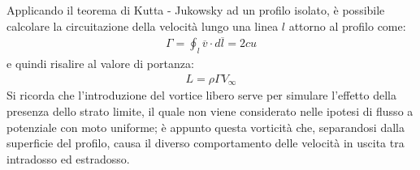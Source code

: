 Applicando il teorema di Kutta - Jukowsky ad un profilo isolato, è possibile calcolare la circuitazione della velocità lungo una linea $l$ attorno al profilo come:
\begin{align*}
\Gamma = \oint_l \overline{v} \cdot d \overline{l} = 2cu
\end{align*}
e quindi risalire al valore di portanza:
\begin{align*}
L=\rho \Gamma V_\infty
\end{align*}
Si ricorda che l'introduzione del vortice libero serve per simulare l'effetto della presenza dello strato limite, il quale non viene considerato nelle ipotesi di flusso a potenziale con moto uniforme; è appunto questa vorticità che, separandosi dalla superficie del profilo, causa il diverso comportamento delle velocità in uscita tra intradosso ed estradosso.

